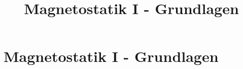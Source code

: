

\title[TET: Magnetostatik I - Grundlagen]{Magnetostatik I - Grundlagen}


% 
% 

\maketitle

% 
% 
\section{Magnetostatik I - Grundlagen}


